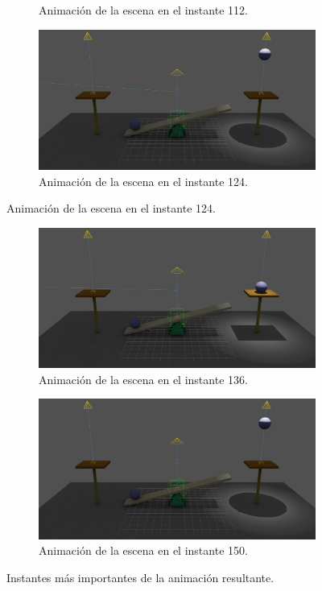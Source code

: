 \begin{figure}[H]
\begin{subfigure}[t]{0.48\textwidth}
    \caption{Animación de la escena en el instante 112.}
 \end{subfigure}
\hfill
 \begin{subfigure}[t]{0.48\textwidth}
    \centering
    \includegraphics[width=\textwidth]{imagenes/animaciones/general/124.jpg}
    \caption{Animación de la escena en el instante 124.}
 \end{subfigure}
\end{figure}

\begin{figure}[H]\ContinuedFloat
 \begin{subfigure}[t]{0.48\textwidth}
    \centering
    \includegraphics[width=\textwidth]{imagenes/animaciones/general/136.jpg}
    \caption{Animación de la escena en el instante 136.}
 \end{subfigure}
\hfill
 \begin{subfigure}[t]{0.48\textwidth}
    \centering
    \includegraphics[width=\textwidth]{imagenes/animaciones/general/150.jpg}
    \caption{Animación de la escena en el instante 150.}
 \end{subfigure}
 \caption{Instantes más importantes de la animación resultante.}
\end{figure}